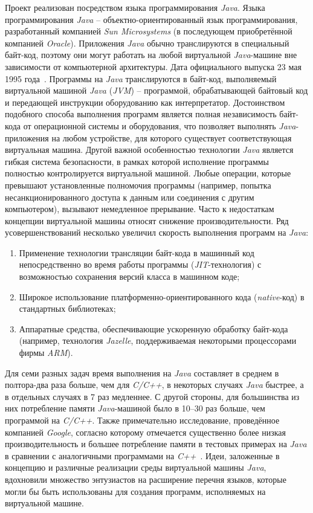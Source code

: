 Проект реализован посредством языка программирования \textit{Java}. Языка программирования \textit{Java} -- объектно-ориентированный язык программирования, разработанный компанией \textit{Sun Microsystems} (в последующем приобретённой компанией \textit{Oracle}). Приложения \textit{Java} обычно транслируются в специальный байт-код, поэтому они могут работать на любой виртуальной \textit{Java}-машине вне зависимости от компьютерной архитектуры. Дата официального выпуска 23 мая 1995 года~\cite{java}.
Программы на \textit{Java} транслируются в байт-код, выполняемый виртуальной машиной \textit{Java} (\textit{JVM}) – программой, обрабатывающей байтовый код и передающей инструкции оборудованию как интерпретатор.
Достоинством подобного способа выполнения программ является полная независимость байт-кода от операционной системы и оборудования, что позволяет выполнять \textit{Java}-приложения на любом устройстве, для которого существует соответствующая виртуальная машина. Другой важной особенностью технологии \textit{Java} является гибкая система безопасности, в рамках которой исполнение программы полностью контролируется виртуальной машиной. Любые операции, которые превышают установленные полномочия программы (например, попытка несанкционированного доступа к данным или соединения с другим компьютером), вызывают немедленное прерывание.
Часто к недостаткам концепции виртуальной машины относят снижение производительности. Ряд усовершенствований несколько увеличил скорость выполнения программ на \textit{Java}:

\begin{enumerate}
	\item Применение технологии трансляции байт-кода в машинный код непосредственно во время работы программы (\textit{JIT}-технология) с возможностью сохранения версий класса в машинном коде;
	\item Широкое использование платформенно-ориентированного кода (\textit{native}-код) в стандартных библиотеках;
	\item Аппаратные средства, обеспечивающие ускоренную обработку байт-кода (например, технология \textit{Jazelle}, поддерживаемая некоторыми процессорами фирмы \textit{ARM}).
\end{enumerate}

Для семи разных задач время выполнения на \textit{Java} составляет в среднем в полтора-два раза больше, чем для \textit{C/C++}, в некоторых случаях \textit{Java} быстрее, а в отдельных случаях в 7 раз медленнее. С другой стороны, для большинства из них потребление памяти \textit{Java}-машиной было в 10–30 раз больше, чем программой на \textit{C/C++}. Также примечательно исследование, проведённое компанией \textit{Google}, согласно которому отмечается существенно более низкая производительность и большее потребление памяти в тестовых примерах на \textit{Java} в сравнении с аналогичными программами на \textit{C++}~\cite{java}.
Идеи, заложенные в концепцию и различные реализации среды виртуальной машины \textit{Java}, вдохновили множество энтузиастов на расширение перечня языков, которые могли бы быть использованы для создания программ, исполняемых на виртуальной машине.

